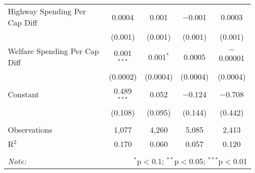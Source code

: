 \begin{table}[!htbp]
\begin{tabular}{@{\extracolsep{5pt}}lcccc}
  Highway Spending Per Cap Diff & 0.0004 & 0.001 & $-$0.001 & 0.0003 \\ 
  & (0.001) & (0.001) & (0.001) & (0.001) \\ 
  Welfare Spending Per Cap Diff & 0.001$^{***}$ & 0.001$^{*}$ & 0.0005 & $-$0.00001 \\ 
  & (0.0002) & (0.0004) & (0.0004) & (0.0004) \\ 
  Constant & 0.489$^{***}$ & 0.052 & $-$0.124 & $-$0.708 \\ 
  & (0.108) & (0.095) & (0.144) & (0.442) \\ 
 \hline \\[-1.8ex] 
Observations & 1,077 & 4,260 & 5,085 & 2,413 \\ 
R$^{2}$ & 0.170 & 0.060 & 0.057 & 0.120 \\ 
\hline 
\hline \\[-1.8ex] 
\textit{Note:}  & \multicolumn{4}{r}{$^{*}$p$<$0.1; $^{**}$p$<$0.05; $^{***}$p$<$0.01} \\ 
\end{tabular} 
\end{table} 
